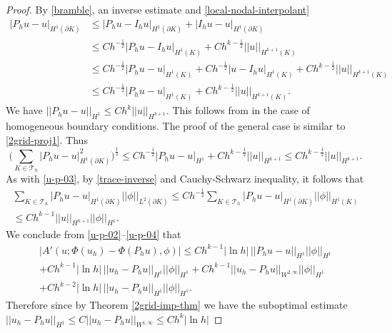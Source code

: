 \documentclass[12pt]{amsart}
\numberwithin{equation}{section}
\begin{document}
\begin{proof}
By \eqref{bramble}, an inverse estimate and \eqref{local-nodal-interpolant} %
\begin{align*}
| P_h u - u |_{H^{1}(\partial K)}  & \leq | P_h u - I_h u |_{H^{1}(\partial K)} + | I_h u - u |_{H^{1}(\partial K)}  \\
& \leq C h^{-\frac{1}{2}}  | P_h u - I_h u |_{H^{1}(K)} + C h^{k-\frac{1}{2}} ||u||_{H^{k+1}(K)} \\
& \leq  C h^{-\frac{1}{2}}  | P_h u -  u |_{H^{1}(K)} +  C h^{-\frac{1}{2}}  | u - I_h u |_{H^{1}(K)} + C h^{k-\frac{1}{2}} ||u||_{H^{k+1}(K)}\\
& \leq C h^{-\frac{1}{2}}  | P_h u -  u |_{H^{1}(K)}  + C h^{k-\frac{1}{2}} ||u||_{H^{k+1}(K)}.
\end{align*}
We have $|| P_h u - u ||_{H^{1}} \leq C h^k ||u||_{H^{k+1}}$. This follows from \cite[Theorem 5.4.4]{Brenner08} in the case of homogeneous boundary conditions. The proof of the general case is similar to \eqref{2grid-proj1}.
Thus
$$
\bigg( \sum_{K \in \mathcal{T}_h} | P_h u - u |_{H^{1}(\partial K)} ^2 \bigg)^{\frac{1}{2}} \leq 
C h^{-\frac{1}{2}}  | P_h u -  u |_{H^{1}}  + C h^{k-\frac{1}{2}} ||u||_{H^{k+1}} \leq C h^{k-\frac{1}{2}} ||u||_{H^{k+1}}.
$$ 
As with \eqref{u-p-03}, by \eqref{trace-inverse} and Cauchy-Schwarz inequality, it follows that
\begin{multline} \label{u-p-04}
 \sum_{K \in \mathcal{T}_h } | P_h u - u |_{H^{1}(\partial K)} ||\phi||_{L^2(\partial K)} \leq 
 C h^{-\frac{1}{2} } \sum_{K \in \mathcal{T}_h } | P_h u - u |_{H^{1}(\partial K)} ||\phi||_{H^1( K)} \\
  \leq 
  C h^{k-1} ||u||_{H^{k+1} } ||\phi||_{H^1}. 
\end{multline}
We conclude from \eqref{u-p-02}--\eqref{u-p-04} that
\begin{multline*} %
| A'(u; \Phi(u_h) - \Phi(P_h u),\phi)| \leq C h^{k-1} | \ln h| \, || P_h u - u ||_{H^{1}} ||\phi||_{H^1} \\
+ C h^{k-1} | \ln h| \, ||  u_h - P_h u  ||_{H^{1}} ||\phi||_{H^1} 
+  C h^{k-1}  ||u_h - P_h u ||_{W^{2,\infty}} ||\phi||_{H^1}  \\
+ C h^{k-2} | \ln h| \, ||  u_h - P_h u  ||_{H^{1}} ||\phi||_{H^1}.
\end{multline*}
Therefore since by Theorem \ref{2grid-imp-thm} we have the suboptimal estimate $ ||  u_h - P_h u  ||_{H^{1}} \leq C ||u_h - P_h u ||_{W^{1,\infty}}  \leq C h^k | \ln h| $

\end{proof}
\end{document}
